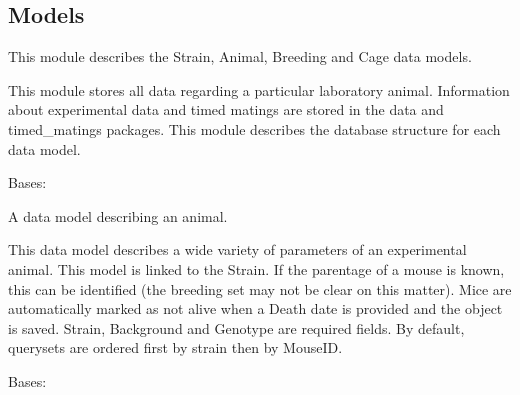 \documentclass[letterpaper,10pt,english]{sphinxmanual}
\begin{document}
\subsection{Models}
\label{api:id3}\label{api:module-mousedb.animal.models}
This module describes the Strain, Animal, Breeding and Cage data models.

This module stores all data regarding a particular laboratory animal.  Information about experimental data and timed matings are stored in the data and timed\_matings packages.  This module describes the database structure for each data model.

\begin{fulllineitems}
\label{api:mousedb.animal.models.Animal}
Bases: 

A data model describing an animal.

This data model describes a wide variety of parameters of an experimental animal.  This model is linked to the Strain.  If the parentage of a mouse is known, this can be identified (the breeding set may not be clear on this matter). Mice are automatically marked as not alive when a Death date is provided and the object is saved.  Strain, Background and Genotype are required fields.  By default, querysets are ordered first by strain then by MouseID.

\begin{fulllineitems}
\label{api:mousedb.animal.models.Animal.Breeding}
\end{fulllineitems}


\begin{fulllineitems}
\label{api:mousedb.animal.models.Animal.DoesNotExist}
Bases: 

\end{fulllineitems}


\begin{fulllineitems}
\label{api:mousedb.animal.models.Animal.Father}
\end{fulllineitems}


\end{fulllineitems}
\end{document}
